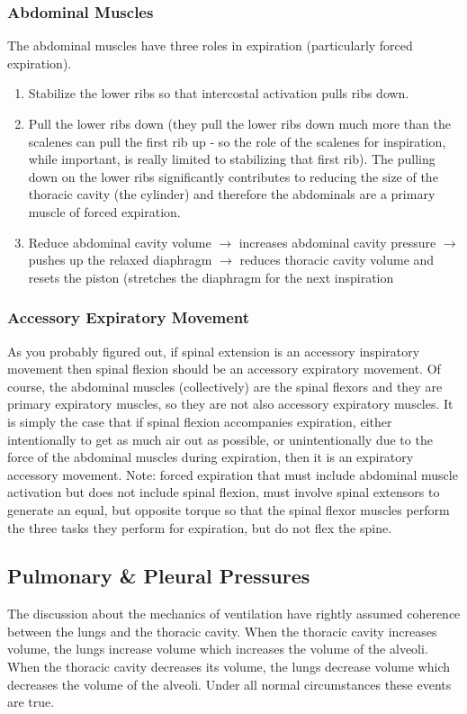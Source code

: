 \subsubsection{Abdominal Muscles}

The abdominal muscles have three roles in expiration (particularly forced expiration).

\begin{enumerate}
\item Stabilize the lower ribs so that intercostal activation pulls ribs down.
\item Pull the lower ribs down (they pull the lower ribs down much more than the scalenes can pull the first rib up - so the role of the scalenes for inspiration, while important, is really limited to stabilizing that first rib). The pulling down on the lower ribs significantly contributes to reducing the size of the thoracic cavity (the cylinder) and therefore the abdominals are a primary muscle of forced expiration.
\item Reduce abdominal cavity volume $\rightarrow$ increases abdominal cavity pressure $\rightarrow$ pushes up the relaxed diaphragm $\rightarrow$ reduces thoracic cavity volume and resets the piston (stretches the diaphragm for the next inspiration
\end{enumerate}

\subsubsection{Accessory Expiratory Movement}

As you probably figured out, if spinal extension is an accessory inspiratory movement then spinal flexion should be an accessory expiratory movement. Of course, the abdominal muscles (collectively) are the spinal flexors and they are primary expiratory muscles, so they are not also accessory expiratory muscles. It is simply the case that if spinal flexion accompanies expiration, either intentionally to get as much air out as possible, or unintentionally due to the force of the abdominal muscles during expiration, then it is an expiratory accessory movement. Note: forced expiration that must include abdominal muscle activation but does not include spinal flexion, must involve spinal extensors to generate an equal, but opposite torque so that the spinal flexor muscles perform the three tasks they perform for expiration, but do not flex the spine.

\subsection{Pulmonary \& Pleural Pressures}
The discussion about the mechanics of ventilation have rightly assumed coherence between the lungs and the thoracic cavity. When the thoracic cavity increases volume, the lungs increase volume which increases the volume of the alveoli. When the thoracic cavity decreases its volume, the lungs decrease volume which decreases the volume of the alveoli. Under all normal circumstances these events are true. 

